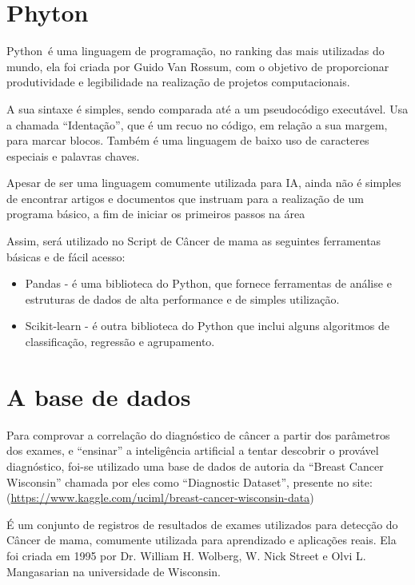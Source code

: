 \section{\textbf{Phyton}}

Python é uma linguagem de programação, no ranking das mais utilizadas do mundo, ela foi criada por Guido Van Rossum, com o objetivo de proporcionar produtividade e legibilidade na realização de projetos computacionais. \cite{PYTHON}

A sua sintaxe é simples, sendo comparada até a um pseudocódigo executável. Usa a chamada “Identação”, que é um recuo no código, em relação a sua margem, para marcar blocos. Também é uma linguagem de baixo uso de caracteres especiais e palavras chaves.

Apesar de ser uma linguagem comumente utilizada para IA, ainda não é simples de encontrar artigos e documentos que instruam para a realização de um programa básico, a fim de iniciar os primeiros passos na área

Assim, será utilizado no Script de Câncer de mama as seguintes ferramentas básicas e de fácil acesso:

\begin{itemize}
\item Pandas - é uma biblioteca do Python, que fornece ferramentas de análise e estruturas de dados de alta performance e de simples utilização.\cite{PANDAS}
\item Scikit-learn - é outra biblioteca do Python que inclui alguns algoritmos de classificação, regressão e agrupamento.\cite{SCIKIT}
\end{itemize}

\section{\textbf{A base de dados}}

Para comprovar a correlação do diagnóstico de câncer a partir dos parâmetros dos exames, e “ensinar” a inteligência artificial a tentar descobrir o provável diagnóstico, foi-se utilizado uma base de dados de autoria da “Breast Cancer Wisconsin” chamada por eles como “Diagnostic Dataset”, presente no site:
(\url{https://www.kaggle.com/uciml/breast-cancer-wisconsin-data})\cite{BREASTCANCER}

É um conjunto de registros de resultados de exames utilizados para detecção do Câncer de mama, comumente utilizada para aprendizado e aplicações reais. Ela foi criada em 1995 por Dr. William H. Wolberg, W. Nick Street e Olvi L. Mangasarian na universidade de Wisconsin.

